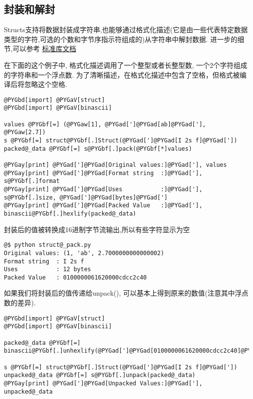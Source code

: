 \documentclass[letterpaper,10pt,english]{manual}
\begin{document}
\subsection{封装和解封}

Structs支持将数据封装成字符串,也能够通过格式化描述(它是由一些代表特定数据类型的字符,可选的个数和字节序指示符组成的)从字符串中解封数据. 进一步的细节,可以参考 \href{http://docs.python.org/library/struct.html}{标准库文档}

在下面的这个例子中, 格式化描述调用了一个整型或者长整型数, 一个2个字符组成的字符串和一个浮点数. 为了清晰描述，在格式化描述中包含了空格，但格式被编译后将忽略这个空格.

\begin{Verbatim}[commandchars=@\[\]]
@PYGbd[import] @PYGaV[struct]
@PYGbd[import] @PYGaV[binascii]

values @PYGbf[=] (@PYGaw[1], @PYGad[']@PYGad[ab]@PYGad['], @PYGaw[2.7])
s @PYGbf[=] struct@PYGbf[.]Struct(@PYGad[']@PYGad[I 2s f]@PYGad['])
packed@_data @PYGbf[=] s@PYGbf[.]pack(@PYGbf[*]values)

@PYGay[print] @PYGad[']@PYGad[Original values:]@PYGad['], values
@PYGay[print] @PYGad[']@PYGad[Format string  :]@PYGad['], s@PYGbf[.]format
@PYGay[print] @PYGad[']@PYGad[Uses           :]@PYGad['], s@PYGbf[.]size, @PYGad[']@PYGad[bytes]@PYGad[']
@PYGay[print] @PYGad[']@PYGad[Packed Value   :]@PYGad['], binascii@PYGbf[.]hexlify(packed@_data)
\end{Verbatim}

封装后的值被转换成16进制字节流输出,所以有些字符显示为空

\begin{Verbatim}[commandchars=@\[\]]
@$ python struct@_pack.py
Original values: (1, 'ab', 2.7000000000000002)
Format string  : I 2s f
Uses           : 12 bytes
Packed Value   : 0100000061620000cdcc2c40
\end{Verbatim}

如果我们将封装后的值传递给unpack(), 可以基本上得到原来的数值(注意其中浮点数的差异).

\begin{Verbatim}[commandchars=@\[\]]
@PYGbd[import] @PYGaV[struct]
@PYGbd[import] @PYGaV[binascii]

packed@_data @PYGbf[=] binascii@PYGbf[.]unhexlify(@PYGad[']@PYGad[0100000061620000cdcc2c40]@PYGad['])

s @PYGbf[=] struct@PYGbf[.]Struct(@PYGad[']@PYGad[I 2s f]@PYGad['])
unpacked@_data @PYGbf[=] s@PYGbf[.]unpack(packed@_data)
@PYGay[print] @PYGad[']@PYGad[Unpacked Values:]@PYGad['], unpacked@_data
\end{Verbatim}
\end{document}
